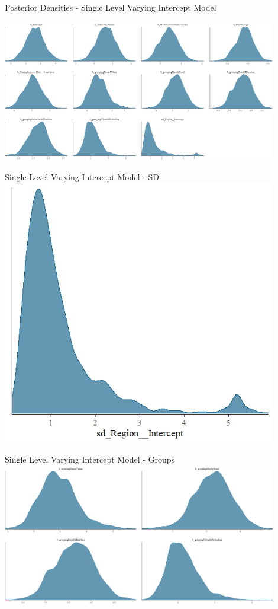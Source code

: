\documentclass{beamer}
\begin{document}
\begin{frame}{Posterior Densities  - Single Level Varying Intercept Model}

\includegraphics[width=0.9\textwidth]{plots/vary_intercept_grouping_density.png}
    
\end{frame}

\begin{frame}{Single Level Varying Intercept Model - SD}
    \includegraphics[width=0.9\textwidth]{plots/sd_vary_intercept_grouping_density.jpeg}
\end{frame}

\begin{frame}{Single Level Varying Intercept Model - Groups}
    \includegraphics[width=0.9\textwidth]{plots/vary_intercept_grouping_density_groups_only.png}
\end{frame}
\end{document}
